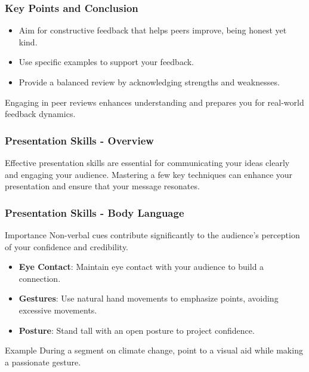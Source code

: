 \documentclass{beamer}
\begin{document}
\begin{frame}[fragile]
    \frametitle{Key Points and Conclusion}
    \begin{itemize}
        \item Aim for constructive feedback that helps peers improve, being honest yet kind.
        \item Use specific examples to support your feedback.
        \item Provide a balanced review by acknowledging strengths and weaknesses.
    \end{itemize}
    
    Engaging in peer reviews enhances understanding and prepares you for real-world feedback dynamics.
\end{frame}

\begin{frame}[fragile]
    \frametitle{Presentation Skills - Overview}
    Effective presentation skills are essential for communicating your ideas clearly and engaging your audience. Mastering a few key techniques can enhance your presentation and ensure that your message resonates.
\end{frame}

\begin{frame}[fragile]
    \frametitle{Presentation Skills - Body Language}
    \begin{block}{Importance}
        Non-verbal cues contribute significantly to the audience's perception of your confidence and credibility.
    \end{block}
    
    \begin{itemize}
        \item \textbf{Eye Contact}: Maintain eye contact with your audience to build a connection.
        \item \textbf{Gestures}: Use natural hand movements to emphasize points, avoiding excessive movements.
        \item \textbf{Posture}: Stand tall with an open posture to project confidence.
    \end{itemize}
    
    \begin{block}{Example}
        During a segment on climate change, point to a visual aid while making a passionate gesture.
    \end{block}
\end{frame}
\end{document}
